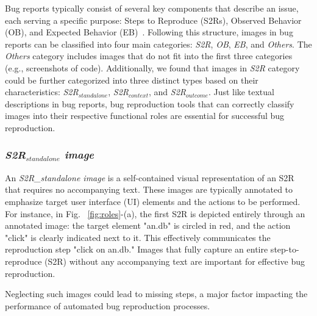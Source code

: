 %
Bug reports typically consist of several key components that describe an issue, each serving a specific purpose: Steps to Reproduce (S2Rs), Observed Behavior (OB), and Expected Behavior (EB)~\cite{chaparroAssessingQualitySteps2019,chaparroDetectingMissingInformation2017}. %
Following this structure, images in bug reports can be classified into four main categories: \textit{S2R}, \textit{OB}, \textit{EB}, and \textit{Others}. The \textit{Others} category includes images that do not fit into the first three categories (e.g., screenshots of code). 
%
Additionally, we found that images in \textit{S2R} category could be further categorized into three distinct types based on their characteristics: \textit{S2R$_{standalone}$}, \textit{S2R$_{context}$}, and \textit{S2R$_{outcome}$}.  
Just like textual descriptions in bug reports, bug reproduction tools that can correctly classify images into their respective functional roles are essential for successful bug reproduction.


\subsubsection{
\textbf{\textit{S2R$_{standalone}$ image}}} 
An \textit{S2R\_standalone image} is a self-contained visual representation of an S2R that requires no accompanying text. 
%
These images are typically annotated to emphasize target user interface (UI) elements and the actions to be performed. 
%
For instance, in Fig. ~\ref{fig:roles}-(a), the first S2R is depicted entirely through an annotated image: the target element "an.db" is circled in red, and the action "click" is clearly indicated next to it. This effectively communicates the reproduction step "click on an.db." Images that fully capture an entire step-to-reproduce (S2R) without any accompanying text are important for effective bug reproduction. 

Neglecting such images could lead to missing steps, a major factor impacting the performance of automated bug reproduction processes. %



